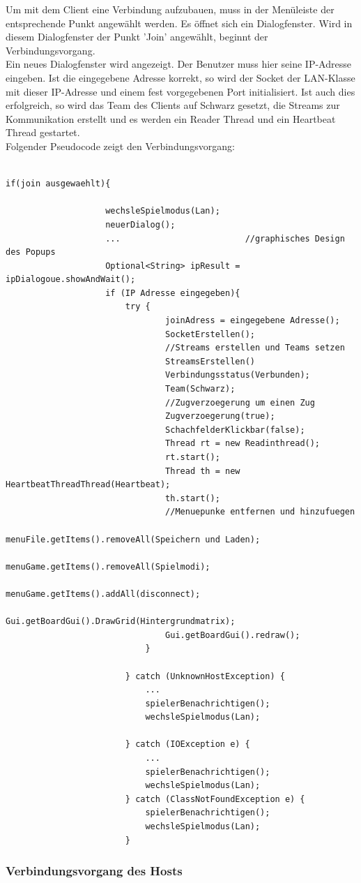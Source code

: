 \documentclass[12pt,a4paper]{article}
\begin{document}
Um mit dem Client eine Verbindung aufzubauen, muss in der Menüleiste der entsprechende Punkt angewählt werden. Es öffnet sich ein Dialogfenster. Wird in diesem Dialogfenster der Punkt 'Join' angewählt, beginnt der Verbindungsvorgang. \\[2ex]
Ein neues Dialogfenster wird angezeigt. Der Benutzer muss hier seine IP-Adresse eingeben. 
Ist die eingegebene Adresse korrekt, so wird der Socket der LAN-Klasse mit dieser IP-Adresse und einem fest vorgegebenen Port initialisiert. 
Ist auch dies erfolgreich, so wird das Team des Clients auf Schwarz gesetzt, die Streams zur Kommunikation erstellt und es werden ein Reader Thread und ein Heartbeat Thread gestartet.\\[2ex]

Folgender Pseudocode zeigt den Verbindungsvorgang: \\
\lstset{language=Java}
\begin{lstlisting}

if(join ausgewaehlt){				

					wechsleSpielmodus(Lan);				
					neuerDialog();
					...							//graphisches Design des Popups
					Optional<String> ipResult = ipDialogoue.showAndWait();
					if (IP Adresse eingegeben){										
						try {
								joinAdress = eingegebene Adresse();
								SocketErstellen();
								//Streams erstellen und Teams setzen	
								StreamsErstellen()
								Verbindungsstatus(Verbunden);
								Team(Schwarz);			
								//Zugverzoegerung um einen Zug		
								Zugverzoegerung(true);
								SchachfelderKlickbar(false);
								Thread rt = new Readinthread();  		
								rt.start();
								Thread th = new HeartbeatThreadThread(Heartbeat);
								th.start();
								//Menuepunke entfernen und hinzufuegen
								menuFile.getItems().removeAll(Speichern und Laden);
								menuGame.getItems().removeAll(Spielmodi);		
								menuGame.getItems().addAll(disconnect);	
								Gui.getBoardGui().DrawGrid(Hintergrundmatrix);		
								Gui.getBoardGui().redraw();
							}

						} catch (UnknownHostException) {
							...
							spielerBenachrichtigen();
							wechsleSpielmodus(Lan);		
							
						} catch (IOException e) {
							...
							spielerBenachrichtigen();
							wechsleSpielmodus(Lan);		
						} catch (ClassNotFoundException e) {
							spielerBenachrichtigen();
							wechsleSpielmodus(Lan);		
						}
\end{lstlisting}

\subsubsection{Verbindungsvorgang des Hosts}
\label{SUBSUBSEC:CONHOST}
\end{document}
